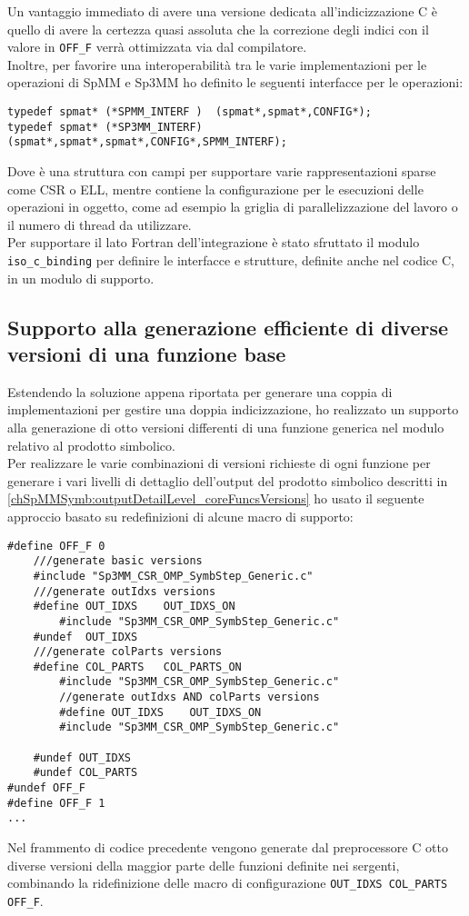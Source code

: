 Un vantaggio immediato di avere una versione dedicata all'indicizzazione C è quello di avere la certezza 
quasi assoluta che la correzione degli indici con il valore  in \verb|OFF_F| verrà ottimizzata via dal compilatore.\\
Inoltre, per favorire una interoperabilità tra le varie implementazioni per le operazioni di SpMM e Sp3MM 
ho definito le seguenti interfacce per le operazioni:
\begin{lstlisting}
typedef spmat* (*SPMM_INTERF )  (spmat*,spmat*,CONFIG*);
typedef spmat* (*SP3MM_INTERF)  (spmat*,spmat*,spmat*,CONFIG*,SPMM_INTERF);
\end{lstlisting}
Dove  è una struttura con campi per supportare varie rappresentazioni sparse 
come CSR o ELL, mentre  contiene la configurazione per le esecuzioni delle operazioni in oggetto,
come ad esempio la griglia di parallelizzazione del lavoro o il numero di thread da utilizzare.\\

Per supportare il lato Fortran dell'integrazione è stato sfruttato il modulo \verb|iso_c_binding| 
per definire le interfacce e strutture, definite anche nel codice C, in un modulo di supporto.\\

\subsection{Supporto alla generazione efficiente di diverse versioni di una funzione base}	\label{chSpMMAux:multiImplMany}
Estendendo la soluzione appena riportata per generare una coppia di implementazioni per gestire una doppia indicizzazione,
ho realizzato un supporto alla generazione di otto versioni differenti di una funzione generica nel modulo relativo al prodotto simbolico.\\
Per realizzare le varie combinazioni di versioni richieste di ogni funzione per generare i vari livelli di dettaglio dell'output 
del prodotto simbolico descritti in \ref{chSpMMSymb:outputDetailLevel_coreFuncsVersions} 
ho usato il seguente approccio basato su redefinizioni di alcune macro di supporto:\\
\begin{lstlisting}
#define OFF_F 0
	///generate basic versions
	#include "Sp3MM_CSR_OMP_SymbStep_Generic.c"
	///generate outIdxs versions
	#define OUT_IDXS 	OUT_IDXS_ON	
		#include "Sp3MM_CSR_OMP_SymbStep_Generic.c"
	#undef  OUT_IDXS
	///generate colParts versions
	#define COL_PARTS	COL_PARTS_ON
		#include "Sp3MM_CSR_OMP_SymbStep_Generic.c"
		//generate outIdxs AND colParts versions
		#define OUT_IDXS 	OUT_IDXS_ON
		#include "Sp3MM_CSR_OMP_SymbStep_Generic.c"

	#undef OUT_IDXS
	#undef COL_PARTS
#undef OFF_F
#define OFF_F 1
...
\end{lstlisting}
Nel frammento di codice precedente vengono generate dal preprocessore C otto diverse versioni
della maggior parte delle funzioni definite nei sergenti, 
combinando la ridefinizione delle macro di configurazione \verb|OUT_IDXS COL_PARTS OFF_F|.\\

